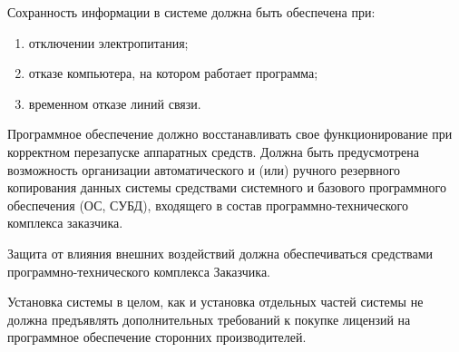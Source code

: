 \documentclass[russian, utf8, 12pt,pointsubsection,floatsubsection]{eskdtext}
\begin{document}
Сохранность информации в системе должна быть обеспечена при:
\begin{enumerate}
    \item отключении электропитания;

\item отказе компьютера, на котором работает программа;

\item временном отказе линий связи.
\end{enumerate}

Программное обеспечение должно восстанавливать свое функционирование при корректном перезапуске аппаратных средств. Должна быть предусмотрена возможность организации автоматического и (или) ручного резервного копирования данных системы средствами системного и базового программного обеспечения (ОС, СУБД), входящего в состав программно-технического комплекса заказчика.



Защита от влияния внешних воздействий должна обеспечиваться средствами программно-технического комплекса Заказчика.


Установка системы в целом, как и установка отдельных частей системы не должна предъявлять дополнительных требований к покупке лицензий на программное обеспечение сторонних производителей.

\end{document}
